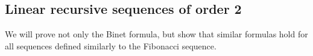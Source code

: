

\setcounter{section}{1}
\setcounter{subsection}{2}
\setcounter{dfn}{1}

\subsection{Linear recursive sequences of order 2}
We will prove not only the Binet formula, but show that similar formulas hold for all sequences defined similarly to the Fibonacci sequence.


